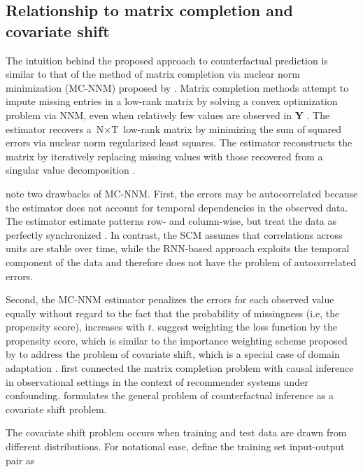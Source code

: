 \subsection{Relationship to matrix completion and covariate shift}

The intuition behind the proposed approach to counterfactual prediction is similar to that of the method of matrix completion via nuclear norm minimization (MC-NNM) proposed by \citet{athey2017matrix}. Matrix completion methods attempt to impute missing entries in a low-rank matrix by solving a convex optimization problem via NNM, even when relatively few values are observed in $\boldsymbol{Y}$ \citep{candes2009exact,candes2010matrix}. The estimator recovers a $\text{N} \times \text{T}$ low-rank matrix by minimizing the sum of squared errors via nuclear norm regularized least squares. The estimator reconstructs the matrix by iteratively replacing missing values with those recovered from a singular value decomposition \citep{mazumder2010spectral}. 

\citet{athey2017matrix} note two drawbacks of MC-NNM. First, the errors may be autocorrelated because the estimator does not account for temporal dependencies in the observed data. The estimator estimate patterns row- and column-wise, but treat the data as perfectly synchronized \citep{yoon2018estimating}. In contrast, the SCM assumes that correlations across units are stable over time, while the RNN-based approach exploits the temporal component of the data and therefore does not have the problem of autocorrelated errors. 

Second, the MC-NNM estimator penalizes the errors for each observed value equally without regard to the fact that the probability of missingness (i.e, the propensity score), increases with $t$. \citet{athey2017matrix} suggest weighting the loss function by the propensity score, which is similar to the importance weighting scheme proposed by \citet{cortes2008sample} to address the problem of covariate shift, which is a special case of domain adaptation \citep{huang2007correcting,ben2007analysis,bickel2009discriminative,cortes2010learning,2015arXiv150507818G}. \citet{schnabel2016recommendations} first connected the matrix completion problem with causal inference in observational settings in the context of recommender systems under confounding. \citet{johansson2016learning} formulates the general problem of counterfactual inference as a covariate shift problem.

The covariate shift problem occurs when training and test data are drawn from different distributions. For notational ease, define the training set input-output pair as 

